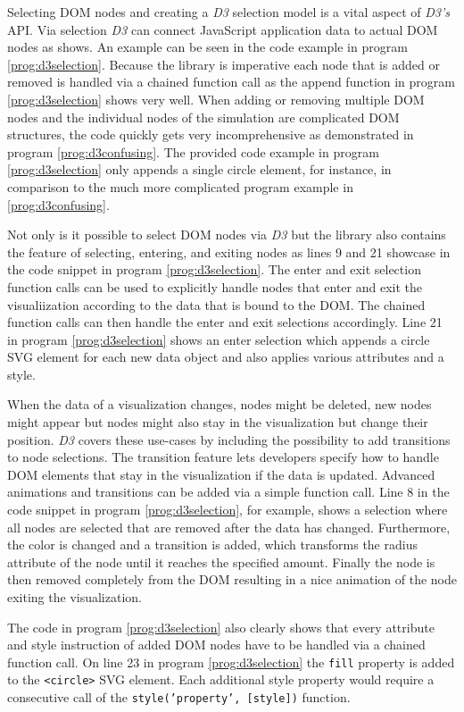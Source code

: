 Selecting DOM nodes and creating a \emph{D3} selection model is a vital aspect of \emph{D3's} API. Via selection \emph{D3} can connect JavaScript application data to actual DOM nodes as \cite{D3Github} shows. An example can be seen in the code example in program \ref{prog:d3selection}. Because the library is imperative each node that is added or removed is handled via a chained function call as the append function in program \ref{prog:d3selection} shows very well. When adding or removing multiple DOM nodes and the individual nodes of the simulation are complicated DOM structures, the code quickly gets very incomprehensive as demonstrated in program \ref{prog:d3confusing}. The provided code example in program \ref{prog:d3selection} only appends a single circle element, for instance, in comparison to the much more complicated program example in \ref{prog:d3confusing}. 

Not only is it possible to select DOM nodes via \emph{D3} but the library also contains the feature of selecting, entering, and exiting nodes as lines 9 and 21 showcase in the code snippet in program \ref{prog:d3selection}. The enter and exit selection function calls can be used to explicitly handle nodes that enter and exit the visualiization according to the data that is bound to the DOM. The chained function calls can then handle the enter and exit selections accordingly. Line 21 in program \ref{prog:d3selection} shows an enter selection which appends a circle SVG element for each new data object and also applies various attributes and a style.

When the data of a visualization changes, nodes might be deleted, new nodes might appear but nodes might also stay in the visualization but change their position. \emph{D3} covers these use-cases by including the possibility to add transitions to node selections. The transition feature lets developers specify how to handle DOM elements that stay in the visualization if the data is updated. Advanced animations and transitions can be added via a simple function call. Line 8 in the code snippet in program \ref{prog:d3selection}, for example, shows a selection where all nodes are selected that are removed after the data has changed. Furthermore, the color is changed and a transition is added, which transforms the radius attribute of the node until it reaches the specified amount. Finally the node is then removed completely from the DOM resulting in a nice animation of the node exiting the visualization.

The code in program \ref{prog:d3selection} also clearly shows that every attribute and style instruction of added DOM nodes have to be handled via a chained function call. On line 23 in program \ref{prog:d3selection} the \texttt{fill} property is added to the \texttt{<circle>} SVG element. Each additional style property would require a consecutive call of the \texttt{style('property', [style])} function.

